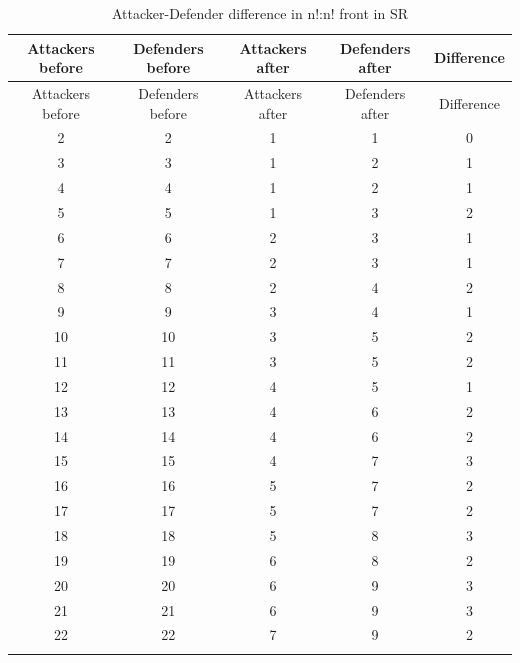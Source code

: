 \small
\begin{longtable}{|c|c|c|c|c|}
\hline
\rowcolor{Baby_Blue}
Attackers before & Defenders before & Attackers after & Defenders after & Difference \\ 
\hline\hline
\endfirsthead
\hline
\rowcolor{Baby_Blue}
Attackers before & Defenders before & Attackers after & Defenders after & Difference \\ 
\hline\hline
\endhead
2  & 2  & 1 & 1 & 0 \\
3  & 3  & 1 & 2 & 1 \\
4  & 4  & 1 & 2 & 1 \\
5  & 5  & 1 & 3 & 2 \\
6  & 6  & 2 & 3 & 1 \\
7  & 7  & 2 & 3 & 1 \\
8  & 8  & 2 & 4 & 2 \\ \hline
9  & 9  & 3 & 4 & 1 \\ \hline
10 & 10 & 3 & 5 & 2 \\
11 & 11 & 3 & 5 & 2 \\ \hline
12 & 12 & 4 & 5 & 1 \\ \hline
13 & 13 & 4 & 6 & 2 \\
14 & 14 & 4 & 6 & 2 \\
15 & 15 & 4 & 7 & 3 \\
16 & 16 & 5 & 7 & 2 \\
17 & 17 & 5 & 7 & 2 \\
18 & 18 & 5 & 8 & 3 \\ \hline
19 & 19 & 6 & 8 & 2 \\ \hline
20 & 20 & 6 & 9 & 3 \\
21 & 21 & 6 & 9 & 3 \\
22 & 22 & 7 & 9 & 2 \\
\hline
\caption{Attacker-Defender difference in n!:n! front in SR}
\label{n!_front_SR}
\end{longtable}
\normalsize

